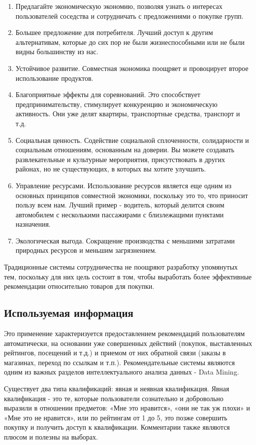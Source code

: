 \begin{enumerate}
\item Предлагайте экономическую экономию, позволяя узнать о интересах пользователей соседства и сотрудничать с предложениями о покупке групп.
\item Большее предложение для потребителя. Лучший доступ к другим альтернативам, которые до сих пор не были жизнеспособными или не были видны большинству из нас.
\item Устойчивое развитие. Совместная экономика поощряет и провоцирует второе использование продуктов.
\item Благоприятные эффекты для соревнований. Это способствует предпринимательству, стимулирует конкуренцию и экономическую активность. Они уже делят квартиры, транспортные средства, транспорт и т.д.
\item Социальная ценность. Содействие социальной сплоченности, солидарности и социальным отношениям, основанным на доверии. Вы можете создавать развлекательные и культурные мероприятия, присутствовать в других районах, но не существующих, в которых вы хотите улучшить.
\item Управление ресурсами. Использование ресурсов является еще одним из основных принципов совместной экономики, поскольку это то, что приносит пользу всем нам. Лучший пример - водитель, который делится своим автомобилем с несколькими пассажирами с близлежащими пунктами назначения.
\item Экологическая выгода. Сокращение производства с меньшими затратами природных ресурсов и меньшим загрязнением.
\end{enumerate}


Традиционные системы сотрудничества не поощряют разработку упомянутых тем, поскольку для них цель состоит в том, чтобы выработать более эффективные рекомендации относительно товаров для покупки.

\subsection{Используемая информация} 
Это применение характеризуется предоставлением рекомендаций пользователям автоматически, на основании уже совершенных действий (покупок, выставленных рейтингов, посещений и т.д.) и приемом от них обратной связи (заказы в магазинах, переход по ссылкам и т.п.).
Рекомендательные системы являются одним из важных разделов интеллектуального анализа данных - Data Mining.

Существует два типа квалификаций: явная и неявная квалификация. Явная квалификация - это те, которые пользователи сознательно и добровольно выразили в отношении предметов: «Мне это нравится», «они не так уж плохи» и «Мне это не нравится», или по рейтингам от 1 до 5, это позже совершить покупку и получить доступ к квалификации. Комментарии также являются плюсом и полезны на выборах.

